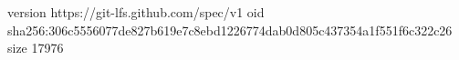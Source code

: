 version https://git-lfs.github.com/spec/v1
oid sha256:306c5556077de827b619e7c8ebd1226774dab0d805c437354a1f551f6c322c26
size 17976
